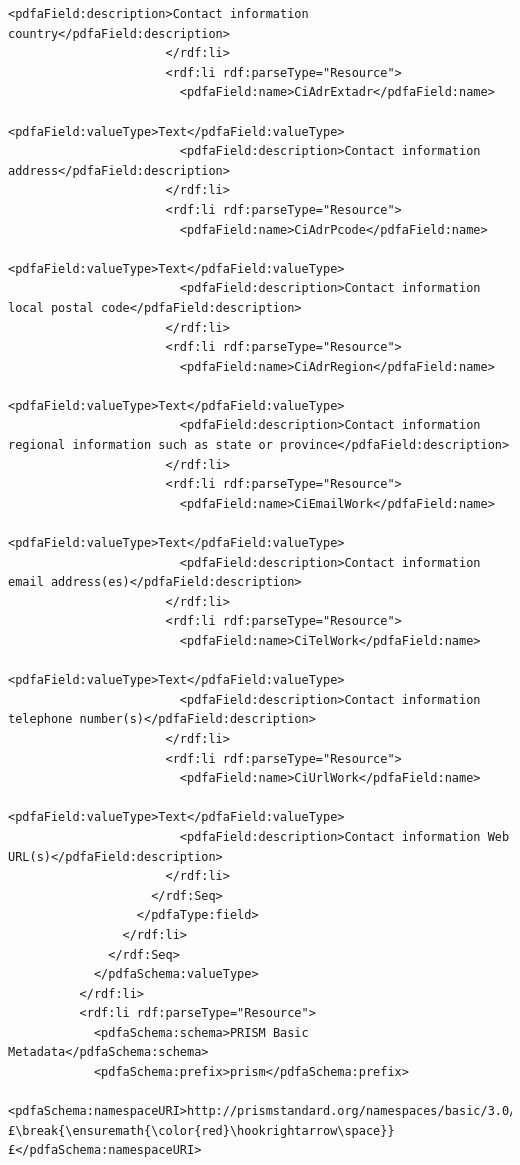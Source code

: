 \begin{lstlisting}[style=myXML,
caption={Second part of the XML metadata embedded in a PDF file (some reformatting has been done to fit the text in the boarders)}, label={lst:pdfinfoOutputPart2}]
                        <pdfaField:description>Contact information country</pdfaField:description>
                      </rdf:li>
                      <rdf:li rdf:parseType="Resource">
                        <pdfaField:name>CiAdrExtadr</pdfaField:name>
                        <pdfaField:valueType>Text</pdfaField:valueType>
                        <pdfaField:description>Contact information address</pdfaField:description>
                      </rdf:li>
                      <rdf:li rdf:parseType="Resource">
                        <pdfaField:name>CiAdrPcode</pdfaField:name>
                        <pdfaField:valueType>Text</pdfaField:valueType>
                        <pdfaField:description>Contact information local postal code</pdfaField:description>
                      </rdf:li>
                      <rdf:li rdf:parseType="Resource">
                        <pdfaField:name>CiAdrRegion</pdfaField:name>
                        <pdfaField:valueType>Text</pdfaField:valueType>
                        <pdfaField:description>Contact information regional information such as state or province</pdfaField:description>
                      </rdf:li>
                      <rdf:li rdf:parseType="Resource">
                        <pdfaField:name>CiEmailWork</pdfaField:name>
                        <pdfaField:valueType>Text</pdfaField:valueType>
                        <pdfaField:description>Contact information email address(es)</pdfaField:description>
                      </rdf:li>
                      <rdf:li rdf:parseType="Resource">
                        <pdfaField:name>CiTelWork</pdfaField:name>
                        <pdfaField:valueType>Text</pdfaField:valueType>
                        <pdfaField:description>Contact information telephone number(s)</pdfaField:description>
                      </rdf:li>
                      <rdf:li rdf:parseType="Resource">
                        <pdfaField:name>CiUrlWork</pdfaField:name>
                        <pdfaField:valueType>Text</pdfaField:valueType>
                        <pdfaField:description>Contact information Web URL(s)</pdfaField:description>
                      </rdf:li>
                    </rdf:Seq>
                  </pdfaType:field>
                </rdf:li>
              </rdf:Seq>
            </pdfaSchema:valueType>
          </rdf:li>
          <rdf:li rdf:parseType="Resource">
            <pdfaSchema:schema>PRISM Basic Metadata</pdfaSchema:schema>
            <pdfaSchema:prefix>prism</pdfaSchema:prefix>
            <pdfaSchema:namespaceURI>http://prismstandard.org/namespaces/basic/3.0/£\break{\ensuremath{\color{red}\hookrightarrow\space}}£</pdfaSchema:namespaceURI>

\end{lstlisting}
